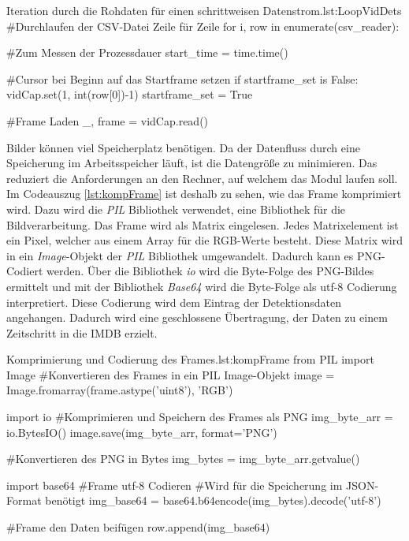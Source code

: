 \begin{pythoncode}{Iteration durch die Rohdaten für einen schrittweisen Datenstrom.}{lst:LoopVidDets}
#Durchlaufen der CSV-Datei Zeile für Zeile
for i, row in enumerate(csv_reader):

    #Zum Messen der Prozessdauer
    start_time = time.time()
    
    #Cursor bei Beginn auf das Startframe setzen
    if startframe_set is False:
        vidCap.set(1, int(row[0])-1)
        startframe_set = True

    #Frame Laden                          
    _, frame = vidCap.read()
\end{pythoncode}

Bilder können viel Speicherplatz benötigen. Da der Datenfluss durch eine Speicherung im Arbeitsspeicher läuft, ist die Datengröße zu minimieren. Das reduziert die Anforderungen an den Rechner, auf welchem das Modul laufen soll. Im Codeauszug \ref{lst:kompFrame} ist deshalb zu sehen, wie das Frame komprimiert wird. Dazu wird die \textit{PIL} Bibliothek verwendet, eine Bibliothek für die Bildverarbeitung. Das Frame wird als Matrix eingelesen. Jedes Matrixelement ist ein Pixel, welcher aus einem Array für die RGB-Werte  besteht. Diese Matrix wird in ein \textit{Image}-Objekt der \textit{PIL} Bibliothek umgewandelt. Dadurch kann es PNG-Codiert werden. Über die Bibliothek \textit{io} wird die Byte-Folge des PNG-Bildes ermittelt und mit der Bibliothek \textit{Base64} wird die Byte-Folge als utf-8 Codierung interpretiert. Diese Codierung wird dem Eintrag der Detektionsdaten angehangen. Dadurch wird eine geschlossene Übertragung, der Daten zu einem Zeitschritt in die IMDB erzielt.

\begin{pythoncode}{Komprimierung und Codierung des Frames.}{lst:kompFrame}
from PIL import Image
#Konvertieren des Frames in ein PIL Image-Objekt
image = Image.fromarray(frame.astype('uint8'), 'RGB')

import io
#Komprimieren und Speichern des Frames als PNG
img_byte_arr = io.BytesIO()
image.save(img_byte_arr, format='PNG')

#Konvertieren des PNG in Bytes
img_bytes = img_byte_arr.getvalue()

import base64
#Frame utf-8 Codieren
#Wird für die Speicherung im JSON-Format benötigt
img_base64 = base64.b64encode(img_bytes).decode('utf-8')

#Frame den Daten beifügen
row.append(img_base64)
\end{pythoncode}

